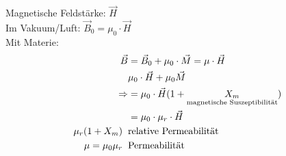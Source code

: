 \noindent Magnetische Feldstärke: $ \vec{H} $ \\
Im Vakuum/Luft: $ \vec{B}_0 = \mu_0 \cdot \vec{H} $\\
Mit Materie: 
\begin{align*}
\vec{B} &= \vec{B}_0 + \mu_0 \cdot \vec{M} = \mu \cdot \vec{H} \\
&\mu_0 \cdot \vec{H} + \mu_0 \vec{M} \\
\Rightarrow &= \mu_0 \cdot \vec{H} (1+\underset{\text{magnetische Suszeptibilität}}{X_m})\\
&=\mu_0 \cdot \mu_r \cdot \vec{H}\\
\mu_r(1+X_m) \hspace{2mm}&\text{relative Permeabilität}\\
\mu = \mu_0\mu_r \hspace{2mm} &\text{Permeabilität}
\end{align*}

